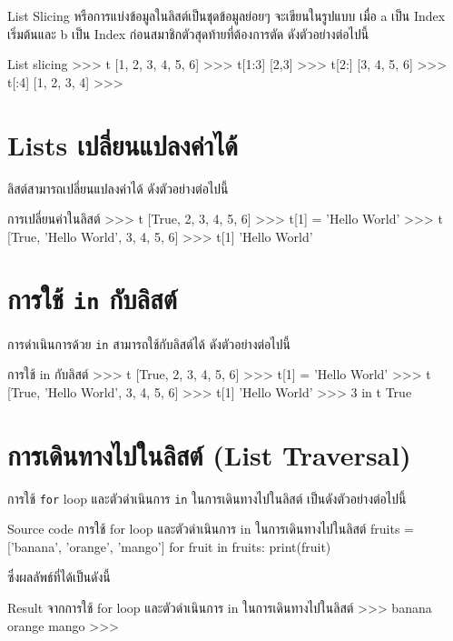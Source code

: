 List Slicing หรือการแบ่งข้อมูลในลิสต์เป็นชุดข้อมูลย่อยๆ จะเขียนในรูปแบบ  \pyinline{[a:b]} เมื่อ a เป็น Index เริ่มต้นและ b เป็น Index ก่อนสมาชิกตัวสุดท้ายที่ต้องการตัด ดังตัวอย่างต่อไปนี้

\begin{codelist}{List slicing}{}
>>> t
[1, 2, 3, 4, 5, 6]
>>> t[1:3]
[2,3]
>>> t[2:]
[3, 4, 5, 6]
>>> t[:4]
[1, 2, 3, 4]
>>>
\end{codelist}

\section{Lists เปลี่ยนแปลงค่าได้}
ลิสต์สามารถเปลี่ยนแปลงค่าได้  ดังตัวอย่างต่อไปนี้

\begin{codelist}{การเปลี่ยนค่าในลิสต์}{}
>>> t
[True, 2, 3, 4, 5, 6]
>>> t[1] = 'Hello World'
>>> t
[True, 'Hello World', 3, 4, 5, 6]
>>> t[1]
'Hello World'
\end{codelist}


\section{การใช้ \texttt{in} กับลิสต์}

การดำเนินการด้วย \texttt{in}  สามารถใช้กับลิสต์ได้  ดังตัวอย่างต่อไปนี้

\begin{codelist}{การใช้ in กับลิสต์}{}
>>> t
[True, 2, 3, 4, 5, 6]
>>> t[1] = 'Hello World'
>>> t
[True, 'Hello World', 3, 4, 5, 6]
>>> t[1]
'Hello World'
>>> 3 in t
True
\end{codelist}


\section{การเดินทางไปในลิสต์ (List Traversal)}

การใช้ \texttt{for} loop และตัวดำเนินการ \texttt{in} ในการเดินทางไปในลิสต์ เป็นดังตัวอย่างต่อไปนี้


\begin{codelist}{Source code การใช้ for loop และตัวดำเนินการ in ในการเดินทางไปในลิสต์}{}
fruits = ['banana', 'orange', 'mango']
for fruit in fruits: print(fruit)
\end{codelist}

ซึ่งผลลัพธ์ที่ได้เป็นดังนี้

\begin{codelist}{Result จากการใช้ for loop และตัวดำเนินการ in ในการเดินทางไปในลิสต์}{}
>>>
banana
orange
mango
>>>
\end{codelist}


